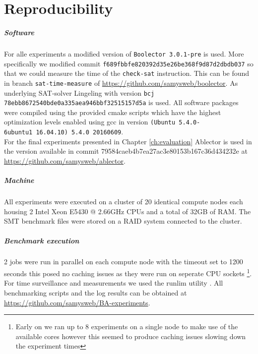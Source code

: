 
\chapter{Reproducibility}
\label{sec:appendix:reproducibility}
\paragraph{Software}
For alle experiments a modified version of \texttt{Boolector 3.0.1-pre} is used.
More specifically we modified commit \texttt{f689fbbfe820392d35e26be368f9d87d2dbdb037} so that we could measure the time of the \texttt{check-sat} instruction. This can be found in branch \texttt{sat-time-measure} of \url{https://github.com/samysweb/boolector}.
As underlying SAT-solver Lingeling \cite{Biere-SAT-Competition-2017-solvers} with version \texttt{bcj 78ebb8672540bde0a335aea946bbf32515157d5a} is used.
All software packages were compiled using the provided cmake scripts which have the highest optimization levels enabled using gcc in version \texttt{(Ubuntu 5.4.0-6ubuntu1~16.04.10) 5.4.0 20160609}.\\
For the final experiments presented in Chapter \ref{ch:evaluation} Ablector is used in the version available in commit 79584caeb4b7ea27ac3e80153b167c36d434232e at \url{https://github.com/samysweb/ablector}.

\paragraph{Machine}
All experiments were executed on a cluster of 20 identical compute nodes each housing 2 Intel Xeon E5430 @ 2.66GHz CPUs and a total of 32GB of RAM.
The SMT benchmark files were stored on a RAID system connected to the cluster.

\paragraph{Benchmark execution}
2 jobs were run in parallel on each compute node with the timeout set to 1200 seconds
this posed no caching issues as they were run on seperate CPU sockets
\footnote{Early on we ran up to 8 experiments on a single node to make use of the available cores however this seemed to produce caching issues slowing down the experiment times}.
For time surveillance and measurements we used the runlim utility \cite{runlim}.
All benchmarking scripts and the log results can be obtained at \url{https://github.com/samysweb/BA-experiments}.

\renewcommand{\simplechapterdelim}{.}
\listoffigures
